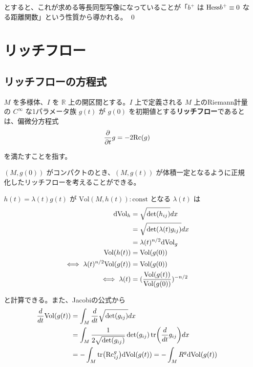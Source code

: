 \documentclass[dvipdfmx,a4paper]{jsreport}
\theoremstyle{definition}
\newcommand{\der}{\partial}
\newcommand{\Vol}{{\rm Vol}}
\newcommand{\dVol}{{\rm dVol}}
\newcommand{\Rc}{{\rm Rc}}
\newcommand{\Hess}{{\rm Hess}}
\newcommand{\R}{\mathbb{R}}
\begin{document}
とすると、これが求める等長同型写像になっていることが「$b^+$ は $\Hess b^+ \equiv 0$ なる距離関数」という性質から導かれる。 \qed







\newpage

\chapter{リッチフロー}

\section{リッチフローの方程式}

 $M$ を多様体、$I$ を $\R$ 上の開区間とする。$I$ 上で定義される $M$ 上のRiemann計量の $C^\infty$ な1パラメータ族 $g(t)$ が $g(0)$ を初期値とする\textbf{リッチフロー}であるとは、偏微分方程式
\begin{align*}
    {\der \over \der t}g=-2\Rc(g)
\end{align*}

を満たすことを指す。

$(M,g(0))$ がコンパクトのとき、$(M,g(t))$ が体積一定となるように正規化したリッチフローを考えることができる。

$h(t)=\lambda(t)g(t)$ が $\mbox{Vol}(M,h(t)):\mbox{const}$ となる $\lambda(t)$ は
\begin{align*}
    \dVol_h &= \sqrt{\det(h_{ij})}dx \\
    &= \sqrt{\det(\lambda(t)g_{ij})}dx \\
    &= \lambda(t)^{n/2}\dVol_g \\
    \Vol(h(t)) &= \Vol(g(0)) \\
    \iff \lambda(t)^{n/2}\Vol(g(t)) &= \Vol(g(0)) \\
    \iff \lambda(t) &= ({\Vol(g(t)) \over \Vol(g(0))})^{-n/2}
\end{align*}

と計算できる。また、Jacobiの公式から
\begin{align*}
    {d \over dt}\Vol(g(t)) &= \int_M {d \over dt}\sqrt{\det(g_{ij})} dx \\
    &= \int_M {1 \over 2\sqrt{\det(g_{ij})}}\det(g_{ij})\tr({d \over dt}g_{ij}) dx \\
    &= -\int_M \tr(\Rc^g_{ij}) \dVol(g(t)) = -\int_M R^g \dVol(g(t)) \\
\end{align*}
\end{document}
